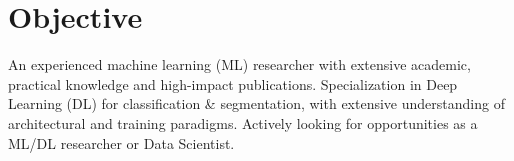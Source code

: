 
\section{Objective}
\hspace{1pt}\parbox{0.99\textwidth}{
An experienced machine learning (ML) researcher with extensive academic, practical knowledge and high-impact publications. Specialization in Deep Learning (DL) for classification \& segmentation, with extensive understanding of architectural and training paradigms. Actively looking for opportunities as a ML/DL researcher or Data Scientist.
}
